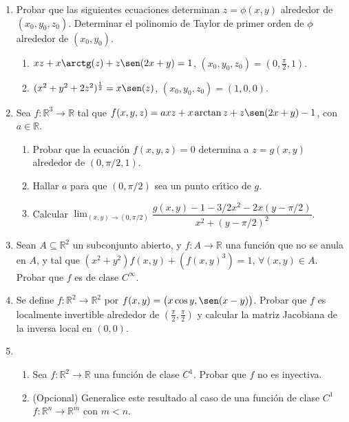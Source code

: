 \documentclass[11pt]{article}
\newcommand{\R}{\mathbb{R}}
\newcommand{\be}{\begin{enumerate}}
\newcommand{\ee}{\end{enumerate}}
\newcommand{\depa}[2]{\ensuremath{\frac{\partial {#1}}{\partial {#2}} }}
\begin{document}
\begin{enumerate}
\item Probar que las siguientes ecuaciones determinan $z=\phi(x,y)$  alrededor de $(x_0, y_0, z_0)$. Determinar el polinomio de Taylor de primer orden de $\phi$ alrededor de $(x_0,y_0)$.
\begin{enumerate}
\item $xz+x\arctg(z) + z\sen(2x + y)=1$, $(x_0, y_0, z_0)=(0,\frac{\pi}{2},1)$.
\item $(x^2+y^2+2z^2)^{\frac{1}{2}}=x\sen(z)$, $(x_0, y_0, z_0)=(1,0,0)$.
\end{enumerate}

\item Sea $f:\R^3\to\R$ tal que $f(x,y,z)=axz+x\arctan
  z+z\sen(2x+y)-1$, con $a\in\R$. 
  \be\item Probar que la ecuaci\'on $f(x,y,z)=0$ determina a
  $z=g(x,y)$ alrededor de $(0,\pi/2,1)$. 
     \item Hallar $a$ para que $(0,\pi/2)$ sea un punto cr\'\i tico de
       $g$. 
     \item Calcular $\lim_{(x,y)\to(0,\pi/2)}
           \dfrac{g(x,y)-1-3/2x^2-2x(y-\pi/2)}{x^2+(y-\pi/2)^2}$. 
  \ee

\item Sean $A\subseteq\R^2$ un subconjunto abierto, y $f:A\to\R$ una
  funci\'on que no se anula en $A$, y tal que
  $(x^2+y^2)f(x,y)+(f(x,y)^3)=1$, $\forall (x,y)\in A$. Probar que $f$
  es de clase $C^\infty$.   
  
\item  Se define $f:\R^2\to\R^2$ por $f(x,y)=\big(x\cos y, \sen(x-y)\big)$. 
Probar que $f$ es localmente invertible alrededor de $\left(\frac\pi 2,\frac\pi 2\right)$ y calcular la matriz Jacobiana de la inversa local en $(0,0)$.

\item \be\item Sea $f:\R^2\to\R$ una funci\'on de clase $C^1$. Probar
  que $f$ no es inyectiva.
  
  
         \item (Opcional) Generalice este resultado al caso de una
           funci\'on de clase $C^1$ $f:\R^n\to \R^m$ con $m<n$. 
      \ee
\end{enumerate}
\end{document}
